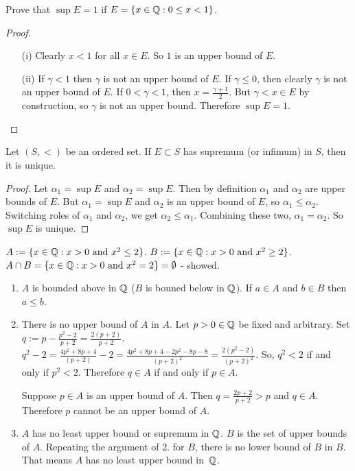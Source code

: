 \documentclass[]{article}
\begin{document}
Prove that $\sup E = 1$ if $E = \{x \in \mathbb{Q} : 0 \leq x < 1\}$.

\begin{proof}
	\begin{enumerate}
		\item[(i)] Clearly $x<1$ for all $x\in E$. So $1$ is an upper bound of $E$.
		\item[(ii)] If $\gamma < 1$ then $\gamma$ is not an upper bound of $E$. If $\gamma \leq 0$, then clearly $\gamma$ is not an upper bound of $E$. If $0<\gamma < 1$, then $x = \frac{\gamma + 1}{2}$. But $\gamma < x\in E$ by construction, so $\gamma$ is not an upper bound. Therefore \ul{$ \sup E = 1$}.
	\end{enumerate}
\end{proof}

\begin{theorem}
	 Let $(S,<)$ be an ordered set. If $E\subset S$ has supremum (or infimum) in $S$, then it is unique.
	\begin{proof}
		Let $\alpha_1 = \sup E$ and $\alpha_2 = \sup E$. Then by definition $\alpha_1$ and $\alpha_2$ are upper bounds of $E$. But $\alpha_1 = \sup E$ and $\alpha_2$ is an upper bound of $E$, so $\alpha_1 \leq \alpha_2$. Switching roles of $\alpha_1$ and $\alpha_2$, we get $\alpha_2 \leq \alpha_1$. Combining these two, $\alpha_1 = \alpha_2$. So $\sup E$ is unique.
	\end{proof}
\end{theorem}
\begin{example}
	$A := \{ x\in\mathbb{Q} : x>0 \text{ and } x^2 \leq 2\}$. $B:=\{ x\in\mathbb{Q}: x>0 \text{ and } x^2\geq 2\}$. $A\cap B = \{ x \in\mathbb{Q} : x>0 \text{ and } x^2 = 2\} = \emptyset$ - showed.
	\begin{enumerate}
		\item $A$ is bounded above in $\mathbb{Q}$ ($B$ is bouned below in $\mathbb{Q}$).
		If $a\in A$ and $b\in B$ then $a\leq b$.
		\item There is no upper bound of $A$ in $A$.
		Let $p>0\in \mathbb{Q}$ be fixed and arbitrary. Set $q:= p - \frac{p^2-2}{p+2} = \frac{2(p+2)}{p+2}$. $q^2-2 = \frac{4p^2 + 8p +4}{(p+2)} - 2 = \frac{4p^2 + 8p + 4 - 2p^2 - 8p - 8}{(p+2)^2} = \frac{2(p^2-2)}{(p+2)^2}$. So, $q^2 < 2$ if and only if $p^2 < 2$. Therefore $q\in A$ if and only if $p\in A$.
		
		Suppose $p\in A$ is an upper bound of $A$. Then $q = \frac{2p+2}{p+2} > p$ and $q\in A$. Therefore $p$ cannot be an upper bound of $A$.
		\item $A$ has no least upper bound or supremum in $\mathbb{Q}$.
		$B$ is the set of upper bounds of $A$. Repeating the argument of 2. for $B$, there is no lower bound of $B$ in $B$.
		That means $A$ has no least upper bound in~$\mathbb{Q}$.
	\end{enumerate}
\end{example}
\end{document}
